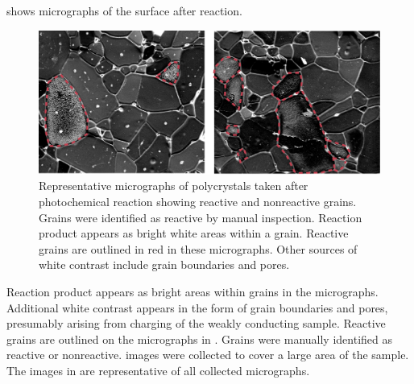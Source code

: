  shows  micrographs of the  surface after
reaction.
\begin{figure}
	\includegraphics[width=\textwidth]{semimages.pdf}
	\caption[Representative  micrographs after photochemical reaction]{%
		Representative  micrographs of  polycrystals taken after
photochemical reaction showing reactive and nonreactive grains. Grains were identified as 
		reactive by manual inspection. Reaction product appears as bright white areas
within a grain. Reactive 
		grains are outlined in red in these micrographs. Other sources of white contrast
include grain boundaries and 
		pores.}
	\label{fig:semimages}
\end{figure}
Reaction product appears as bright areas within grains in the  micrographs.
Additional white contrast appears in the form of grain boundaries and pores, presumably
arising from charging of the weakly conducting sample. Reactive grains are outlined on the
micrographs in . Grains were manually identified as reactive or
nonreactive.  images were collected to cover a large area of the sample. The
images in  are representative of all collected micrographs.

